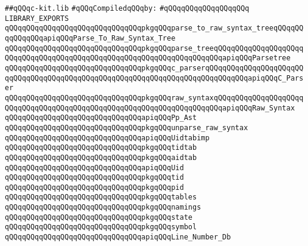 \label{src/lib/c-kit/src/c-kit.lib}
\verb|##qQQqc-kit.lib|\newline
\newline
\verb|#qQQqCompiledqQQqby:|\newline
\verb|#qQQqqQQqqQQqqQQqqQQq|\newline
\newline
\verb|LIBRARY_EXPORTS|\newline
\newline
\newline
\verb|qQQqqQQqqQQqqQQqqQQqqQQqqQQqqQQqpkgqQQqparse_to_raw_syntax_treeqQQqqQQqqQQqqQQqapiqQQqParse_To_Raw_Syntax_Tree|\newline
\verb|qQQqqQQqqQQqqQQqqQQqqQQqqQQqqQQqpkgqQQqparse_treeqQQqqQQqqQQqqQQqqQQqqQQqqQQqqQQqqQQqqQQqqQQqqQQqqQQqqQQqqQQqqQQqqQQqqQQqapiqQQqParsetree|\newline
\verb|qQQqqQQqqQQqqQQqqQQqqQQqqQQqqQQqpkgqQQqc_parserqQQqqQQqqQQqqQQqqQQqqQQqqQQqqQQqqQQqqQQqqQQqqQQqqQQqqQQqqQQqqQQqqQQqqQQqqQQqqQQqapiqQQqC_Parser|\newline
\verb|qQQqqQQqqQQqqQQqqQQqqQQqqQQqqQQqpkgqQQqraw_syntaxqQQqqQQqqQQqqQQqqQQqqQQqqQQqqQQqqQQqqQQqqQQqqQQqqQQqqQQqqQQqqQQqqQQqqQQqapiqQQqRaw_Syntax|\newline
\verb|qQQqqQQqqQQqqQQqqQQqqQQqqQQqqQQqapiqQQqPp_Ast|\newline
\verb|qQQqqQQqqQQqqQQqqQQqqQQqqQQqqQQqpkgqQQqunparse_raw_syntax|\newline
\verb|qQQqqQQqqQQqqQQqqQQqqQQqqQQqqQQqapiqQQqUidtabimp|\newline
\verb|qQQqqQQqqQQqqQQqqQQqqQQqqQQqqQQqpkgqQQqtidtab|\newline
\verb|qQQqqQQqqQQqqQQqqQQqqQQqqQQqqQQqpkgqQQqaidtab|\newline
\verb|qQQqqQQqqQQqqQQqqQQqqQQqqQQqqQQqapiqQQqUid|\newline
\verb|qQQqqQQqqQQqqQQqqQQqqQQqqQQqqQQqpkgqQQqtid|\newline
\verb|qQQqqQQqqQQqqQQqqQQqqQQqqQQqqQQqpkgqQQqpid|\newline
\verb|qQQqqQQqqQQqqQQqqQQqqQQqqQQqqQQqpkgqQQqtables|\newline
\verb|qQQqqQQqqQQqqQQqqQQqqQQqqQQqqQQqpkgqQQqnamings|\newline
\verb|qQQqqQQqqQQqqQQqqQQqqQQqqQQqqQQqpkgqQQqstate|\newline
\verb|qQQqqQQqqQQqqQQqqQQqqQQqqQQqqQQqpkgqQQqsymbol|\newline
\verb|qQQqqQQqqQQqqQQqqQQqqQQqqQQqqQQqapiqQQqLine_Number_Db|\newline
